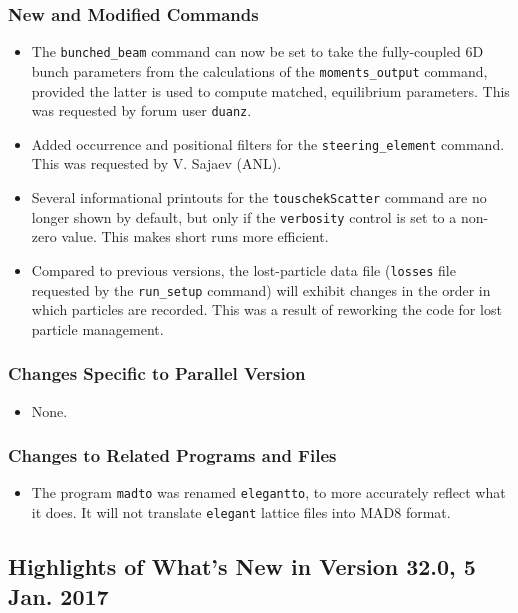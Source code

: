 \documentclass[11pt]{article}
\begin{document}
\subsubsection{New and Modified Commands}
\begin{itemize}
\item The \verb|bunched_beam| command can now be set to take the fully-coupled 6D bunch parameters from the calculations of the
  \verb|moments_output| command, provided the latter is used to compute matched, equilibrium parameters.
  This was requested by forum user \verb|duanz|.
\item Added occurrence and positional filters for the \verb|steering_element| command. This was requested by V. Sajaev (ANL).
\item Several informational printouts for the \verb|touschekScatter| command are no longer shown by default, but only if the 
  \verb|verbosity| control is set to a non-zero value. This makes short runs more efficient.
\item Compared to previous versions, the lost-particle data file (\verb|losses| file requested by the \verb|run_setup|
  command) will exhibit changes in the order in which particles are recorded. This was a result of reworking the code for
  lost particle management.
\end{itemize}

\subsubsection{Changes Specific to Parallel Version}

\begin{itemize}
\item None.
\end{itemize}

\subsubsection{Changes to Related Programs and Files}

\begin{itemize}
\item The program \verb|madto| was renamed \verb|elegantto|, to more accurately reflect what it does.
  It will not translate \verb|elegant| lattice files into MAD8 format.
\end{itemize}

\subsection{Highlights of What's New in Version 32.0, 5 Jan. 2017}
\end{document}
